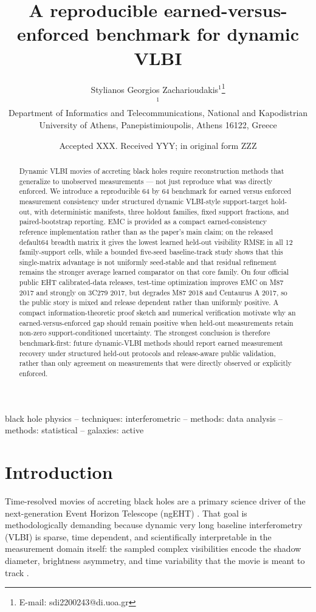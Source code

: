 \documentclass[fleqn,usenatbib]{mnras}
\title[A reproducible earned-versus-enforced benchmark for dynamic VLBI]{A reproducible earned-versus-enforced benchmark for dynamic VLBI}
\author[Zacharioudakis]{Stylianos Georgios Zacharioudakis$^{1}$\thanks{E-mail: sdi2200243@di.uoa.gr}\\
$^{1}$\parbox[t]{0.84\textwidth}{Department of Informatics and Telecommunications, National and Kapodistrian University of Athens, Panepistimioupolis, Athens 16122, Greece}}
\date{Accepted XXX. Received YYY; in original form ZZZ}
\begin{document}
\label{firstpage}
\pagerange{\pageref{firstpage}--\pageref{lastpage}}
\maketitle

\begin{abstract}
Dynamic VLBI movies of accreting black holes require reconstruction methods that generalize to unobserved measurements --- not just reproduce what was directly enforced. We introduce a reproducible 64 by 64 benchmark for earned versus enforced measurement consistency under structured dynamic VLBI-style support-target hold-out, with deterministic manifests, three holdout families, fixed support fractions, and paired-bootstrap reporting. EMC is provided as a compact earned-consistency reference implementation rather than as the paper's main claim; on the released default64 breadth matrix it gives the lowest learned held-out visibility RMSE in all 12 family-support cells, while a bounded five-seed baseline-track study shows that this single-matrix advantage is not uniformly seed-stable and that residual refinement remains the stronger average learned comparator on that core family. On four official public EHT calibrated-data releases, test-time optimization improves EMC on M87 2017 and strongly on 3C279 2017, but degrades M87 2018 and Centaurus A 2017, so the public story is mixed and release dependent rather than uniformly positive. A compact information-theoretic proof sketch and numerical verification motivate why an earned-versus-enforced gap should remain positive when held-out measurements retain non-zero support-conditioned uncertainty. The strongest conclusion is therefore benchmark-first: future dynamic-VLBI methods should report earned measurement recovery under structured held-out protocols and release-aware public validation, rather than only agreement on measurements that were directly observed or explicitly enforced.
\end{abstract}

\begin{keywords}
black hole physics -- techniques: interferometric -- methods: data analysis -- methods: statistical -- galaxies: active
\end{keywords}

\section{Introduction}

Time-resolved movies of accreting black holes are a primary science driver of the next-generation Event Horizon Telescope (ngEHT) \citep{ngEHTScience,ngEHTConcept,ngEHTTechnology}. That goal is methodologically demanding because dynamic very long baseline interferometry (VLBI) is sparse, time dependent, and scientifically interpretable in the measurement domain itself: the sampled complex visibilities encode the shadow diameter, brightness asymmetry, and time variability that the movie is meant to track \citep{EHT2019M87I,EHT2019M87III,EHT2019M87IV,EHT2022SgrAI,EHT2022SgrAII,EHT2022SgrAIII,Farah2022SelectiveDynamicalImaging,Satapathy2022M87Variability,Georgiev2022UniversalPowerLaw}.
\end{document}
